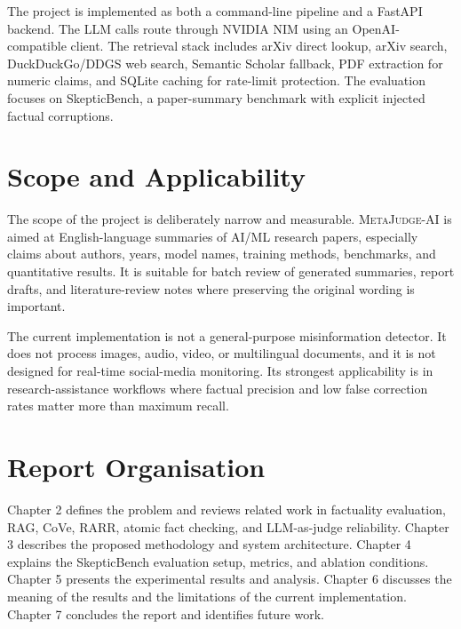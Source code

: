 \documentclass[12pt, a4paper]{report}
\newcommand{\sys}{\textsc{MetaJudge-AI}}
\begin{document}
The project is implemented as both a command-line pipeline and a FastAPI backend.
The LLM calls route through NVIDIA NIM using an OpenAI-compatible client. The
retrieval stack includes arXiv direct lookup, arXiv search, DuckDuckGo/DDGS web
search, Semantic Scholar fallback, PDF extraction for numeric claims, and SQLite
caching for rate-limit protection. The evaluation focuses on SkepticBench, a
paper-summary benchmark with explicit injected factual corruptions.

\section{Scope and Applicability}

The scope of the project is deliberately narrow and measurable. \sys{} is aimed
at English-language summaries of AI/ML research papers, especially claims about
authors, years, model names, training methods, benchmarks, and quantitative
results. It is suitable for batch review of generated summaries, report drafts,
and literature-review notes where preserving the original wording is important.

The current implementation is not a general-purpose misinformation detector. It
does not process images, audio, video, or multilingual documents, and it is not
designed for real-time social-media monitoring. Its strongest applicability is in
research-assistance workflows where factual precision and low false correction
rates matter more than maximum recall.

\section{Report Organisation}

Chapter 2 defines the problem and reviews related work in factuality evaluation,
RAG, CoVe, RARR, atomic fact checking, and LLM-as-judge reliability. Chapter 3
describes the proposed methodology and system architecture. Chapter 4 explains
the SkepticBench evaluation setup, metrics, and ablation conditions. Chapter 5
presents the experimental results and analysis. Chapter 6 discusses the meaning
of the results and the limitations of the current implementation. Chapter 7
concludes the report and identifies future work.



\end{document}
